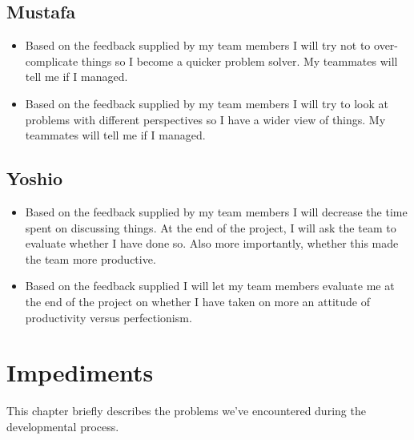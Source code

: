 \documentclass[12pt]{article}
\begin{document}
	\subsection{Mustafa}
	\begin{itemize}
		\item Based on the feedback supplied by my team members I will try not to over-complicate things so I become a quicker problem solver. My teammates will tell me if I managed.
		\item Based on the feedback supplied by my team members I will try to look at problems with different perspectives so I have a wider view of things. My teammates will tell me if I managed.
	\end{itemize}
	\subsection{Yoshio}
	\begin{itemize}
		\item Based on the feedback supplied by my team members I will decrease the time spent on discussing things. At the end of the project, I will ask the team to evaluate whether I have done so. Also more importantly, whether this made the team more productive.
		\item Based on the feedback supplied I will let my team members evaluate me at the end of the project on whether I have taken on more an attitude of productivity versus perfectionism.
	\end{itemize}
	\newpage

	\newpage
	\section{Impediments}
	This chapter briefly describes the problems we've encountered during the developmental process.
\end{document}
